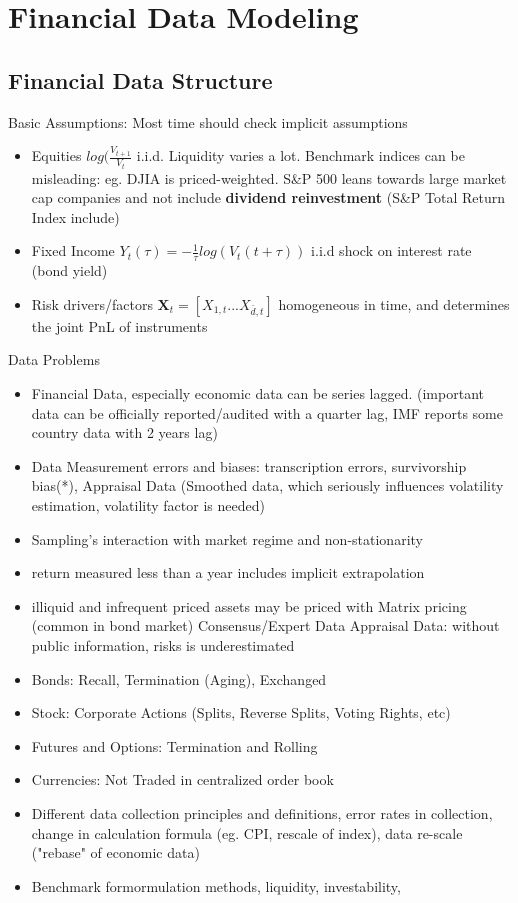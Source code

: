 \documentclass[11pt, openany]{book}              %
\begin{document}
\chapter{Financial Data Modeling}

\section{Financial Data Structure}

Basic Assumptions: Most time should check implicit assumptions

\begin{itemize}
\item Equities $log(\frac{V_{t+1}}{V_t}$ i.i.d. Liquidity varies a lot. Benchmark indices can be misleading: eg. DJIA is priced-weighted. S\&P 500 leans towards large market cap companies and not include \textbf{dividend reinvestment} (S\&P Total Return Index include)
\item Fixed Income $Y_t(\tau) = -\frac{1}{\tau} log(V_t(t+\tau))$ i.i.d shock on interest rate (bond yield)
\item Risk drivers/factors $\mathbf{X}_t = [X_{1,t}...X_{\bar{d},t}]$ homogeneous in time, and determines the joint PnL of instruments

\end{itemize}

Data Problems
\begin{itemize}
 \item Financial Data, especially economic data can be series lagged. (important data can be officially reported/audited with a quarter lag, IMF reports some country data with 2 years lag)
 \item Data Measurement errors and biases: transcription errors, survivorship bias(*), Appraisal Data (Smoothed data, which seriously influences volatility estimation, volatility factor is needed)
 \item Sampling's interaction with market regime and non-stationarity
 \item return measured less than a year includes implicit extrapolation
 \item illiquid and infrequent priced assets may be priced with
 	\subitem Matrix pricing (common in bond market)
 	\subitem Consensus/Expert Data
 	\subitem Appraisal Data: without public information, risks is underestimated 
 \item Bonds: Recall, Termination (Aging), Exchanged
 \item Stock: Corporate Actions (Splits, Reverse Splits, Voting Rights, etc)
 \item Futures and Options: Termination and Rolling
 \item Currencies: Not Traded in centralized order book 
 \item Different data collection principles and definitions, error rates in collection, change in calculation formula (eg. CPI, rescale of index), data re-scale ("rebase" of economic data)
 \item Benchmark formormulation methods, liquidity, investability,
\end{itemize}
\end{document}
